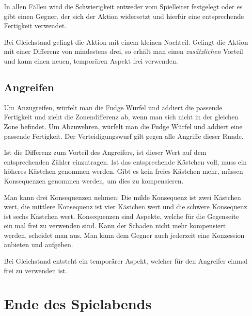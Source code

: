 \documentclass{tufte-handout}
\begin{document}
\noindent In allen Fällen wird die Schwierigkeit entweder vom
Spielleiter festgelegt oder es gibt einen Gegner, der sich der Aktion
widersetzt und hierfür eine entsprechende Fertigkeit verwendet.

Bei Gleichstand gelingt die Aktion mit einem kleinen Nachteil. Gelingt
die Aktion mit einer Differenz von mindestens drei, so erhält man
einen \emph{zusätzlichen} Vorteil und kann einen neuen, temporären
Aspekt frei verwenden.


\subsection{Angreifen}

Um Anzugreifen, würfelt man die Fudge Würfel und addiert die passende
Fertigkeit und zieht die Zonendifferenz ab, wenn man sich nicht in der
gleichen Zone befindet. Um Abzuwehren, würfelt man die Fudge Würfel
und addiert eine passende Fertigkeit. Der Verteidigungswurf gilt gegen
alle Angriffe dieser Runde.

Ist die Differenz zum Vorteil des Angreifers, ist dieser Wert auf dem
entsprechenden Zähler einzutragen. Ist das entsprechende Kästchen
voll, muss ein höheres Kästchen genommen werden. Gibt es kein freies
Kästchen mehr, müssen Konsequenzen genommen werden, um dies zu
kompensieren.

Man kann drei Konsequenzen nehmen: Die milde Konsequenz ist zwei
Kästchen wert, die mittlere Konsequenz ist vier Kästchen wert und die
schwere Konsequenz ist sechs Kästchen wert. Konsequenzen sind Aspekte,
welche für die Gegenseite ein mal frei zu verwenden sind. Kann der
Schaden nicht mehr kompensiert werden, scheidet man aus. Man kann dem
Gegner auch jederzeit eine Konzession anbieten und aufgeben.

Bei Gleichstand entsteht ein temporärer Aspekt, welcher für den
Angreifer einmal frei zu verwenden ist.

\clearpage


\section{Ende des Spielabends}

\end{document}
